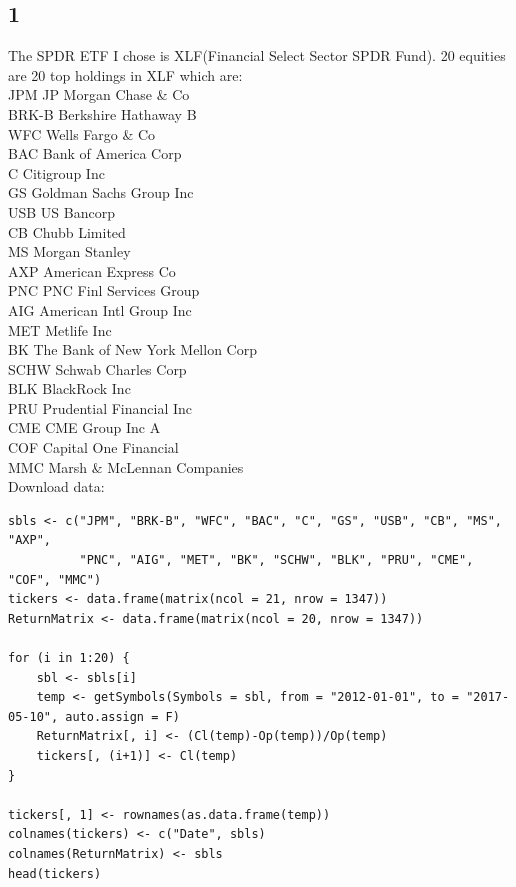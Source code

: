 \documentclass{article}
\begin{document}
\subsection{1}
The SPDR ETF I chose is XLF(Financial Select Sector SPDR Fund). 20 equities are 20 top holdings in XLF which are: \\
JPM	JP Morgan Chase \& Co\\
BRK-B	Berkshire Hathaway B\\
WFC	Wells Fargo \& Co\\
BAC	Bank of America Corp\\
C	Citigroup Inc\\
GS	Goldman Sachs Group Inc\\
USB	US Bancorp\\
CB	Chubb Limited\\
MS	Morgan Stanley\\
AXP	American Express Co\\
PNC	PNC Finl Services Group\\
AIG	American Intl Group Inc\\
MET	Metlife Inc\\
BK	The Bank of New York Mellon Corp\\
SCHW	Schwab Charles Corp\\
BLK	BlackRock Inc\\
PRU	Prudential Financial Inc\\
CME	CME Group Inc A\\
COF	Capital One Financial\\
MMC	Marsh \& McLennan Companies\\


Download data:
\begin{verbatim}
sbls <- c("JPM", "BRK-B", "WFC", "BAC", "C", "GS", "USB", "CB", "MS", "AXP", 
          "PNC", "AIG", "MET", "BK", "SCHW", "BLK", "PRU", "CME", "COF", "MMC")
tickers <- data.frame(matrix(ncol = 21, nrow = 1347))
ReturnMatrix <- data.frame(matrix(ncol = 20, nrow = 1347))

for (i in 1:20) {
    sbl <- sbls[i]
    temp <- getSymbols(Symbols = sbl, from = "2012-01-01", to = "2017-05-10", auto.assign = F)
    ReturnMatrix[, i] <- (Cl(temp)-Op(temp))/Op(temp)
    tickers[, (i+1)] <- Cl(temp)
}

tickers[, 1] <- rownames(as.data.frame(temp))
colnames(tickers) <- c("Date", sbls)
colnames(ReturnMatrix) <- sbls
head(tickers)
\end{verbatim}
\end{document}
